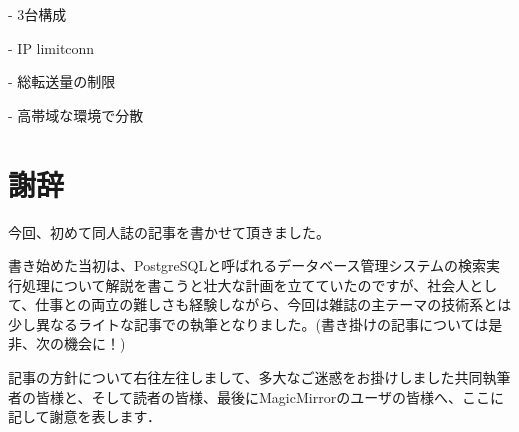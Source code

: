  

- 3台構成

- IP limitconn

- 総転送量の制限

- 高帯域な環境で分散

 

 

 


%




 

\section{謝辞}

今回、初めて同人誌の記事を書かせて頂きました。

書き始めた当初は、PostgreSQLと呼ばれるデータベース管理システムの検索実行処理について解説を書こうと壮大な計画を立てていたのですが、社会人として、仕事との両立の難しさも経験しながら、今回は雑誌の主テーマの技術系とは少し異なるライトな記事での執筆となりました。(書き掛けの記事については是非、次の機会に！)

 

記事の方針について右往左往しまして、多大なご迷惑をお掛けしました共同執筆者の皆様と、そして読者の皆様、最後にMagicMirrorのユーザの皆様へ、ここに記して謝意を表します．